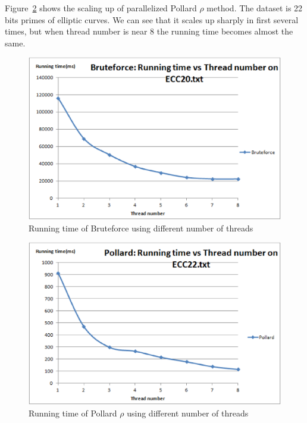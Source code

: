\documentclass[10pt,a4paper]{article}
\begin{document}
\indent Figure~\ref{runningtime_p2} shows the scaling up of parallelized Pollard $\rho$ method. The dataset is 22 bits primes of elliptic curves. We can see that it scales up sharply in first several times, but when thread number is near 8 the running time becomes almost the same. \\
\begin{figure}
  \centering
    \includegraphics[scale=0.4]{runningtime_b2.eps}
  \caption{Running time of Bruteforce using different number of threads}
  \label{runningtime_b2}
\end{figure}
\begin{figure}
  \centering
    \includegraphics[scale=0.4]{runningtime_p2.eps}
  \caption{Running time of Pollard $\rho$ using different number of threads}
  \label{runningtime_p2}
\end{figure}    	
\end{document}
